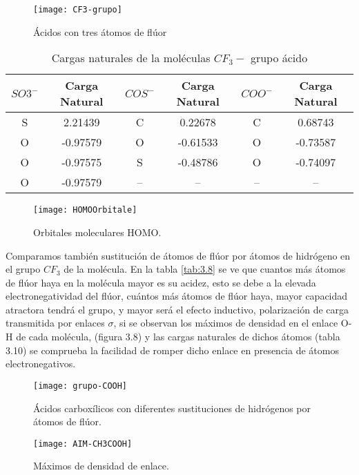 \begin{figure}[H]
	\centering
	\texttt{[image: CF3-grupo]}
	\caption{Ácidos con tres átomos de flúor}
\end{figure}

\begin{table}[H]
    \centering
    \begin{tabular}{|c|c|c|c|c|c|}
    \hline
    $SO3^-$ & Carga Natural &$COS^-$ & Carga Natural & $COO^-$ & Carga Natural \\ \hline
    S & 2.21439 & C & 0.22678 & C & 0.68743 \\ \hline
    O & -0.97579 & O & -0.61533 & O & -0.73587 \\ \hline
    O & -0.97575 & S & -0.48786 & O & -0.74097 \\ \hline
    O & -0.97579 & -- & -- & -- & -- \\ \hline
    \end{tabular}
    \caption{Cargas naturales de la moléculas $CF_3-$ grupo ácido}
\end{table}

\begin{figure}[H]
\centering
\texttt{[image: HOMOOrbitale]}
\caption{Orbitales moleculares HOMO.}
\end{figure}

Comparamos también sustitución de átomos de flúor por átomos de hidrógeno en el grupo $CF_3$ de la molécula. En la tabla \ref{tab:3.8} se ve que cuantos más átomos de flúor haya en la molécula mayor es su acidez, esto se debe a la elevada electronegatividad del flúor, cuántos más átomos de flúor haya, mayor capacidad atractora tendrá el grupo, y mayor será el efecto inductivo, polarización de carga transmitida por enlaces $\sigma$, si se observan los máximos de densidad en el enlace O-H de cada molécula, (figura 3.8) y las cargas naturales de dichos átomos (tabla 3.10) se comprueba la facilidad de romper dicho enlace en presencia de átomos electronegativos.

\begin{figure}[H]
	\centering
	\texttt{[image: grupo-COOH]}
	\caption{Ácidos carboxílicos con diferentes sustituciones de hidrógenos por átomos de flúor.}
\end{figure}
\begin{figure}[H]
\centering
\texttt{[image: AIM-CH3COOH]}\cite{AIM}
\caption{Máximos de densidad de enlace.}
\end{figure}

